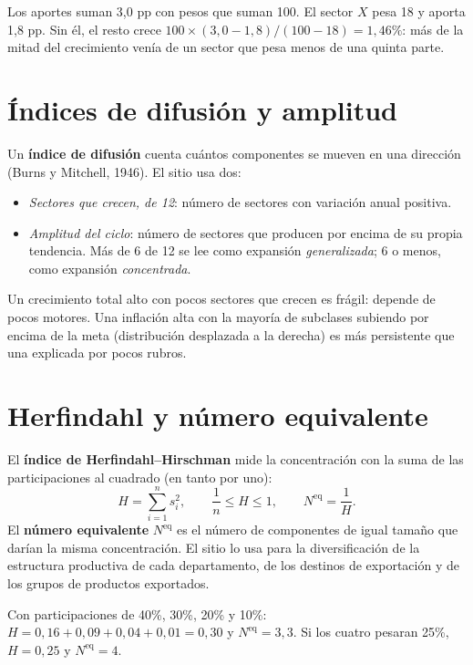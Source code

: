\begin{dato}
Los aportes suman 3,0 pp con pesos que suman 100. El sector $X$ pesa 18 y aporta 1,8 pp. Sin él, el resto crece
$100\times(3{,}0-1{,}8)/(100-18)=1{,}46\%$: más de la mitad del crecimiento venía de un sector que pesa menos de una
quinta parte.
\end{dato}

\section{Índices de difusión y amplitud}
\label{es:f:difusion}
Un \textbf{índice de difusión} cuenta cuántos componentes se mueven en una dirección (Burns y Mitchell, 1946). El
sitio usa dos:
\begin{itemize}
\item \emph{Sectores que crecen, de 12}: número de sectores con variación anual positiva.
\item \emph{Amplitud del ciclo}: número de sectores que producen por encima de su propia tendencia. Más de 6 de 12
  se lee como expansión \emph{generalizada}; 6 o menos, como expansión \emph{concentrada}.
\end{itemize}

\begin{leer}
Un crecimiento total alto con pocos sectores que crecen es frágil: depende de pocos motores. Una inflación alta con
la mayoría de subclases subiendo por encima de la meta (distribución desplazada a la derecha) es más persistente que
una explicada por pocos rubros.
\end{leer}

\section{Herfindahl y número equivalente}
\label{es:f:herfindahl}
El \textbf{índice de Herfindahl--Hirschman} mide la concentración con la suma de las participaciones al cuadrado
(en tanto por uno):
\[
H=\sum_{i=1}^{n}s_i^2,\qquad \frac1n\le H\le 1,\qquad N^{\text{eq}}=\frac1H .
\]
El \textbf{número equivalente} $N^{\text{eq}}$ es el número de componentes de igual tamaño que darían la misma
concentración. El sitio lo usa para la diversificación de la estructura productiva de cada departamento, de los
destinos de exportación y de los grupos de productos exportados.

\begin{dato}
Con participaciones de 40\%, 30\%, 20\% y 10\%: $H=0{,}16+0{,}09+0{,}04+0{,}01=0{,}30$ y $N^{\text{eq}}=3{,}3$. Si
los cuatro pesaran 25\%, $H=0{,}25$ y $N^{\text{eq}}=4$.
\end{dato}

